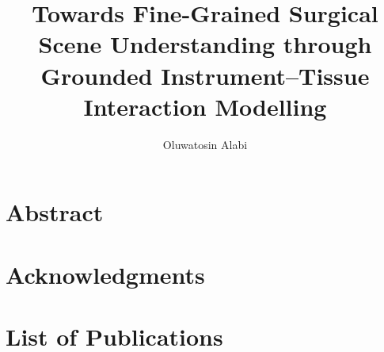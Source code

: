 \documentclass[british,a4paper,11pt,twoside]{ThesisStyle}
\title{Towards Fine-Grained Surgical Scene Understanding through Grounded Instrument--Tissue Interaction Modelling}\let\thetitle\@title
\author{Oluwatosin Alabi}\let\theauthor\@author
\begin{document}
\frontmatter


%

\dominitoc

\copyrightpage{\the\year}{\theauthor}
\declarationpage{\theauthor}

\cleardoublepage
\chapter{Abstract}


\cleardoublepage
\chapter{Acknowledgments}


\cleardoublepage
\chapter{List of Publications}
\label{chap:pub}


\cleardoublepage
\tableofcontents

\clearpage
{}
\mtcaddchapter[\listtablename]
\listoftables

\clearpage
{}
\mtcaddchapter[\listfigurename]
\listoffigures

\mainmatter













\backmatter

\begingroup
\setlength{\emergencystretch}{2em}
\printbibliography[heading=bibintoc,env=thesisbibenv]
\endgroup
\end{document}
